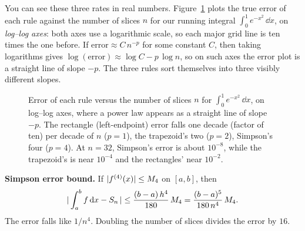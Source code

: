 You can see these three rates in real numbers. Figure~\ref{ch27:fig-conv} plots the true error of each rule against the number of slices $n$ for our running integral $\int_0^1 e^{-x^2}\,\dd x$, on \emph{log--log axes}: both axes use a logarithmic scale, so each major grid line is ten times the one before. If $\text{error} \approx C\,n^{-p}$ for some constant $C$, then taking logarithms gives $\log(\text{error}) \approx \log C - p\,\log n$, so on such axes the error plot is a straight line of slope $-p$. The three rules sort themselves into three visibly different slopes.

\begin{figure}[htbp]
\centering
{}
\caption{Error of each rule versus the number of slices $n$ for $\int_0^1 e^{-x^2}\,\dd x$, on log--log axes, where a power law appears as a straight line of slope $-p$. The rectangle (left-endpoint) error falls one decade (factor of ten) per decade of $n$ ($p=1$), the trapezoid's two ($p=2$), Simpson's four ($p=4$). At $n=32$, Simpson's error is about $10^{-8}$, while the trapezoid's is near $10^{-4}$ and the rectangles' near $10^{-2}$.}
\label{ch27:fig-conv}
\end{figure}

\begin{focusbox}
\textbf{Simpson error bound.} If $\lvert f^{(4)}(x)\rvert \le M_4$ on $[a,b]$, then
\[
\lvert\,\int_a^b f\,\mathrm{d} x - S_n\,\rvert \le \frac{(b-a)\,h^4}{180}\,M_4 = \frac{(b-a)^5}{180\,n^4}\,M_4.
\]
The error falls like $1/n^4$. Doubling the number of slices divides the error by $16$.
\end{focusbox}

